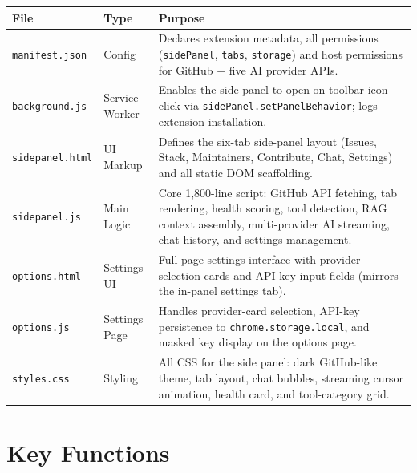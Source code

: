 \documentclass[11pt,a4paper]{article}
\begin{document}
\begin{longtable}{L{3.4cm} L{1.5cm} L{8.6cm}}
    \toprule
    \textbf{File} & \textbf{Type} & \textbf{Purpose} \\
    \midrule
    \endhead

    \bottomrule
    \endfoot

    \texttt{manifest.json} & Config &
        Declares extension metadata, all permissions (\texttt{sidePanel}, \texttt{tabs}, \texttt{storage}) and host permissions for GitHub + five AI provider APIs. \\
    \addlinespace

    \texttt{background.js} & Service Worker &
        Enables the side panel to open on toolbar-icon click via \texttt{sidePanel.setPanelBehavior}; logs extension installation. \\
    \addlinespace

    \texttt{sidepanel.html} & UI Markup &
        Defines the six-tab side-panel layout (Issues, Stack, Maintainers, Contribute, Chat, Settings) and all static DOM scaffolding. \\
    \addlinespace

    \texttt{sidepanel.js} & Main Logic &
        Core 1,800-line script: GitHub API fetching, tab rendering, health scoring, tool detection, RAG context assembly, multi-provider AI streaming, chat history, and settings management. \\
    \addlinespace

    \texttt{options.html} & Settings UI &
        Full-page settings interface with provider selection cards and API-key input fields (mirrors the in-panel settings tab). \\
    \addlinespace

    \texttt{options.js} & Settings Page &
        Handles provider-card selection, API-key persistence to \texttt{chrome.storage.local}, and masked key display on the options page. \\
    \addlinespace

    \texttt{styles.css} & Styling &
        All CSS for the side panel: dark GitHub-like theme, tab layout, chat bubbles, streaming cursor animation, health card, and tool-category grid. \\


\end{longtable}

\section{Key Functions}
\end{document}
